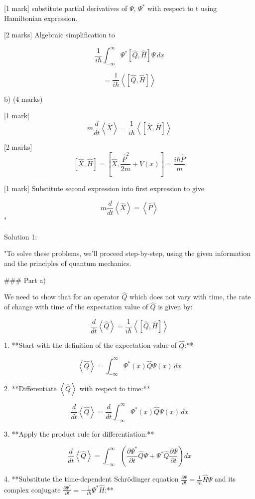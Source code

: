[1 mark] substitute partial derivatives of \(\Psi\), \(\Psi^{*}\) with respect to t using Hamiltonian expression.

[2 marks] Algebraic simplification to 

\[ \frac{1}{i\hbar} \int_{-\infty}^{\infty} \Psi^{*} \left [ \hat{Q}, \hat{H} \right ] \Psi \, dx \]

\[ = \frac{1}{i\hbar} \left<  \left [ \hat{Q}, \hat{H} \right ] \right> \]

b) (4 marks)

[1 mark]\[m \frac{d}{dt}  \left<\hat{X}\right> = \frac{1}{i\hbar}\left< \left[ \hat{X}, \hat{H} \right] \right> \] 

[2 marks] \[\left[ \hat{X}, \hat{H}\right] = \left[ \hat{X}, \frac{\hat{P}^{2}}{2m} + V(x)\right] = \frac{i\hbar \hat{P}}{m} \]

[1 mark] Substitute second expression into first expression to give 

\[m \frac{d}{dt}\left<\hat{X}\right> =  \left<\hat{P}\right> \]
"

Solution 1:

"To solve these problems, we'll proceed step-by-step, using the given information and the principles of quantum mechanics.

### Part a)

We need to show that for an operator \( \hat{Q} \) which does not vary with time, the rate of change with time of the expectation value of \( \hat{Q} \) is given by:

\[ \frac{d}{dt}\left<\hat{Q}\right> = \frac{1}{i\hbar}\left< \left[ \hat{Q}, \hat{H} \right] \right> \]

1. **Start with the definition of the expectation value of \( \hat{Q} \):**

\[ \left< \hat{Q} \right> = \int_{-\infty}^{\infty} \Psi^{*}(x) \hat{Q} \Psi(x) \, dx \]

2. **Differentiate \( \left< \hat{Q} \right> \) with respect to time:**

\[ \frac{d}{dt}\left<\hat{Q}\right> = \frac{d}{dt}\int_{-\infty}^{\infty} \Psi^{*}(x) \hat{Q} \Psi(x) \, dx \]

3. **Apply the product rule for differentiation:**

\[ \frac{d}{dt}\left<\hat{Q}\right> = \int_{-\infty}^{\infty} \left( \frac{\partial \Psi^{*}}{\partial t} \hat{Q} \Psi + \Psi^{*} \hat{Q} \frac{\partial \Psi}{\partial t} \right) dx \]

4. **Substitute the time-dependent Schrödinger equation \( \frac{\partial\Psi}{\partial t} = \frac{1}{i\hbar}\hat{H}\Psi \) and its complex conjugate \( \frac{\partial\Psi^{*}}{\partial t} = -\frac{1}{i\hbar}\Psi^{*}\hat{H} \):**

